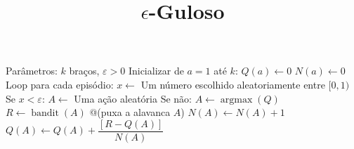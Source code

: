 \documentclass[brazilian,preview]{standalone}
\title{$\epsilon$-Guloso}
\begin{document}
\begin{algorithm}
Parâmetros: $k$ braços, $\varepsilon > 0$
Inicializar de $a=1$ até $k$:
    $Q(a) \leftarrow 0$ 
    $N(a) \leftarrow 0$ 
Loop para cada episódio:
    $x \leftarrow $ Um número escolhido aleatoriamente entre $[0, 1)$
    Se $x < \varepsilon$:
        $A \leftarrow$  Uma ação aleatória
    Se não: 
        $A \leftarrow \operatorname{argmax}(Q)$ 
    $R \leftarrow \operatorname{bandit}(A)$ @\hfill@ (puxa a alavanca $A$)
    $N(A) \leftarrow N(A) + 1$
    $Q(A) \leftarrow Q(A) + \dfrac{[R - Q(A)]}{N(A)}$

\end{algorithm}
\end{document}
